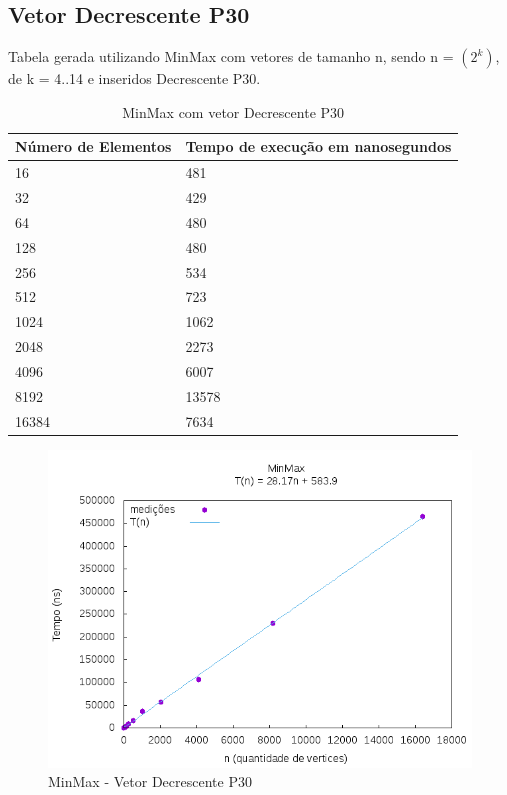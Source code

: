 \documentclass[12pt,a4paper,twoside]{report}
\begin{document}
\subsection{Vetor Decrescente P30}
Tabela gerada utilizando MinMax com vetores de tamanho n, sendo n = $(2^k)$, de k = 4..14 e inseridos Decrescente P30.
\begin{table}[H]
\centering
\caption{MinMax com vetor Decrescente P30}
\label{my-label}
\begin{tabular}{|l|l|}
\hline
\multicolumn{1}{|c|}{\textbf{Número de Elementos}} & \multicolumn{1}{c|}{\textbf{Tempo de execução em nanosegundos}} \\ \hline
16 & 481 \\ \hline
32 & 429 \\ \hline
64 & 480 \\ \hline
128 & 480 \\ \hline
256 & 534 \\ \hline
512 & 723 \\ \hline
1024 & 1062 \\ \hline
2048 & 2273 \\ \hline
4096 & 6007 \\ \hline
8192 & 13578 \\ \hline
16384 & 7634 \\ \hline
\end{tabular}
\end{table}

\begin{figure}[H]
    \centering
    \includegraphics[width=0.7\linewidth]{graficos/Min Max/Decrescente P30/MinMax.png}
  \caption{MinMax - Vetor Decrescente P30}
\end{figure}
\end{document}
